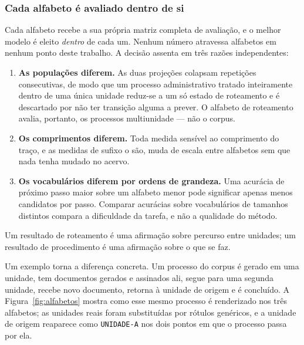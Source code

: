 \subsubsection*{Cada alfabeto é avaliado dentro de si}

Cada alfabeto recebe a sua própria matriz completa de avaliação, e o melhor modelo é eleito
\emph{dentro} de cada um. Nenhum número atravessa alfabetos em nenhum ponto deste trabalho. A
decisão assenta em três razões independentes:

\begin{enumerate}
  \item \textbf{As populações diferem.} As duas projeções colapsam repetições consecutivas, de modo
    que um processo administrativo tratado inteiramente dentro de uma única unidade reduz-se a um
    só estado de roteamento e é descartado por não ter transição alguma a prever. O alfabeto de
    roteamento avalia, portanto, os processos multiunidade --- não o corpus.
  \item \textbf{Os comprimentos diferem.} Toda medida sensível ao comprimento do traço, e as
    medidas de sufixo o são, muda de escala entre alfabetos sem que nada tenha mudado no acervo.
  \item \textbf{Os vocabulários diferem por ordens de grandeza.} Uma acurácia de próximo passo
    maior sobre um alfabeto menor pode significar apenas menos candidatos por passo. Comparar
    acurácias sobre vocabulários de tamanhos distintos compara a dificuldade da tarefa, e não a
    qualidade do método.
\end{enumerate}

Um resultado de roteamento é uma afirmação sobre percurso entre unidades; um resultado de
procedimento é uma afirmação sobre o que se faz.

Um exemplo torna a diferença concreta. Um processo do corpus é gerado em uma unidade, tem
documentos gerados e assinados ali, segue para uma segunda unidade, recebe novo documento, retorna
à unidade de origem e é concluído. A Figura~\ref{fig:alfabetos} mostra como esse mesmo processo é
renderizado nos três alfabetos; as unidades reais foram substituídas por rótulos genéricos, e a
unidade de origem reaparece como \texttt{UNIDADE-A} nos dois pontos em que o processo passa por ela.

